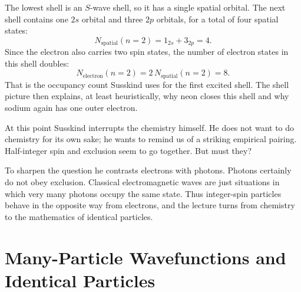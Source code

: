 \begin{figure}
\end{figure}

The lowest shell is an \(S\)-wave shell, so it has a single spatial orbital. The next shell contains one \(2s\) orbital and three \(2p\) orbitals, for a total of four spatial states:
\begin{equation}
N_{\mathrm{spatial}}(n=2)=1_{2s}+3_{2p}=4.
\end{equation}
Since the electron also carries two spin states, the number of electron states in this shell doubles:
\begin{equation}
N_{\mathrm{electron}}(n=2)=2\,N_{\mathrm{spatial}}(n=2)=8.
\end{equation}
That is the occupancy count Susskind uses for the first excited shell. The shell picture then explains, at least heuristically, why neon closes this shell and why sodium again has one outer electron.

At this point Susskind interrupts the chemistry himself. He does not want to do chemistry for its own sake; he wants to remind us of a striking empirical pairing. Half-integer spin and exclusion seem to go together. But must they?

To sharpen the question he contrasts electrons with photons. Photons certainly do not obey exclusion. Classical electromagnetic waves are just situations in which very many photons occupy the same state. Thus integer-spin particles behave in the opposite way from electrons, and the lecture turns from chemistry to the mathematics of identical particles.

\section{Many-Particle Wavefunctions and Identical Particles}

